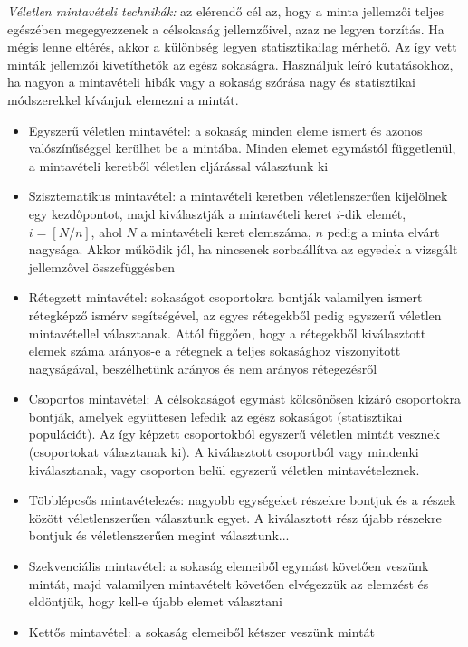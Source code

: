 \emph{Véletlen mintavételi technikák:} az elérendő cél az, hogy 
a minta jellemzői teljes egészében megegyezzenek a célsokaság jellemzőivel, azaz ne legyen torzítás. Ha mégis lenne eltérés, akkor a különbség legyen statisztikailag mérhető. Az így vett minták jellemzői kivetíthetők az egész sokaságra. Használjuk leíró kutatásokhoz, ha nagyon a mintavételi hibák vagy a sokaság szórása nagy és statisztikai módszerekkel kívánjuk elemezni a mintát.
\begin{itemize}
\item Egyszerű véletlen mintavétel: a sokaság minden eleme ismert és azonos valószínűséggel kerülhet be a mintába. Minden elemet egymástól függetlenül, a mintavételi keretből véletlen eljárással választunk ki
\item Szisztematikus mintavétel: a mintavételi keretben véletlenszerűen kijelölnek egy kezdőpontot, majd kiválasztják a mintavételi keret $i$-dik elemét, $i = [N/n]$, ahol $N$ a mintavételi keret elemszáma, $n$ pedig a minta elvárt nagysága. Akkor működik jól, ha nincsenek sorbaállítva az egyedek a vizsgált jellemzővel összefüggésben
\item Rétegzett mintavétel: sokaságot csoportokra bontják valamilyen ismert rétegképző ismérv segítségével, az egyes rétegekből pedig egyszerű véletlen mintavétellel választanak. Attól függően, hogy a rétegekből kiválasztott elemek száma arányos-e a rétegnek a teljes sokasághoz viszonyított nagyságával, beszélhetünk arányos és nem arányos rétegezésről
\item Csoportos mintavétel: A célsokaságot egymást kölcsönösen kizáró csoportokra bontják, amelyek együttesen lefedik az egész sokaságot (statisztikai populációt). Az így képzett csoportokból egyszerű véletlen mintát vesznek (csoportokat választanak ki). A kiválasztott csoportból vagy mindenki kiválasztanak, vagy csoporton belül egyszerű véletlen mintavételeznek.
\item Többlépcsős mintavételezés: nagyobb egységeket részekre bontjuk és a részek között véletlenszerűen választunk egyet. A kiválasztott rész újabb részekre bontjuk és véletlenszerűen megint választunk...
\item Szekvenciális mintavétel: a sokaság elemeiből egymást követően veszünk mintát, majd valamilyen mintavételt követően elvégezzük az elemzést és eldöntjük, hogy kell-e újabb elemet választani
\item Kettős mintavétel: a sokaság elemeiből kétszer veszünk mintát
\end{itemize}

